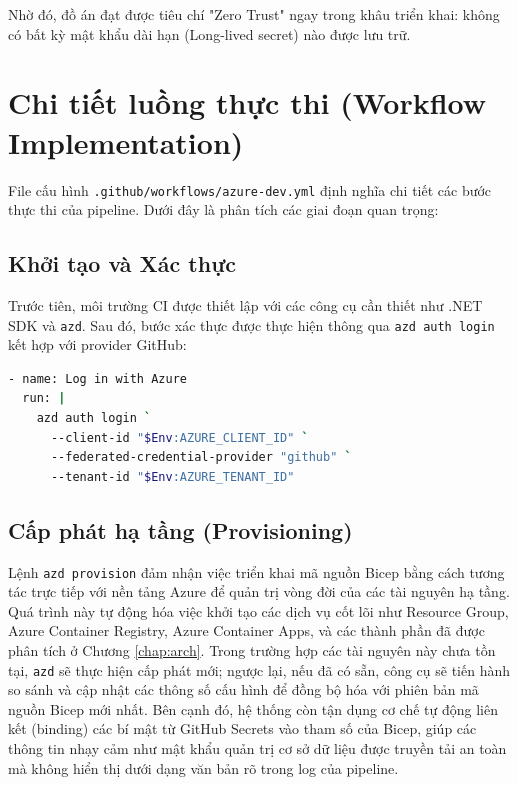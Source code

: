 \documentclass[a4paper,12pt,twoside]{report}
\begin{document}
Nhờ đó, đồ án đạt được tiêu chí "Zero Trust" ngay trong khâu triển khai: không có bất kỳ mật khẩu dài hạn (Long-lived secret) nào được lưu trữ.

\section{Chi tiết luồng thực thi (Workflow Implementation)}

File cấu hình \texttt{.github/workflows/azure-dev.yml} định nghĩa chi tiết các bước thực thi của pipeline. Dưới đây là phân tích các giai đoạn quan trọng:

\subsection{Khởi tạo và Xác thực}
Trước tiên, môi trường CI được thiết lập với các công cụ cần thiết như .NET SDK và \texttt{azd}. Sau đó, bước xác thực được thực hiện thông qua \texttt{azd auth login} kết hợp với provider GitHub:

\begin{lstlisting}[language=bash, caption={Xác thực sử dụng Federated Credentials}, label={code:auth-federated}]
- name: Log in with Azure
  run: |
    azd auth login `
      --client-id "$Env:AZURE_CLIENT_ID" `
      --federated-credential-provider "github" `
      --tenant-id "$Env:AZURE_TENANT_ID"
\end{lstlisting}

\subsection{Cấp phát hạ tầng (Provisioning)}
Lệnh \texttt{azd provision} đảm nhận việc triển khai mã nguồn Bicep bằng cách tương tác trực tiếp với nền tảng Azure để quản trị vòng đời của các tài nguyên hạ tầng. Quá trình này tự động hóa việc khởi tạo các dịch vụ cốt lõi như Resource Group, Azure Container Registry, Azure Container Apps, và các thành phần đã được phân tích ở Chương \ref{chap:arch}. Trong trường hợp các tài nguyên này chưa tồn tại, \texttt{azd} sẽ thực hiện cấp phát mới; ngược lại, nếu đã có sẵn, công cụ sẽ tiến hành so sánh và cập nhật các thông số cấu hình để đồng bộ hóa với phiên bản mã nguồn Bicep mới nhất. Bên cạnh đó, hệ thống còn tận dụng cơ chế tự động liên kết (binding) các bí mật từ GitHub Secrets vào tham số của Bicep, giúp các thông tin nhạy cảm như mật khẩu quản trị cơ sở dữ liệu được truyền tải an toàn mà không hiển thị dưới dạng văn bản rõ trong log của pipeline.
\end{document}
